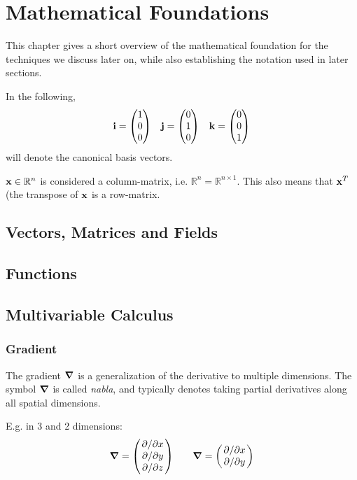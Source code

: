 \chapter{Mathematical Foundations}
\label{sec:mathematicalFoundations}
This chapter gives a short overview of the mathematical foundation for the
techniques we discuss later on, while also establishing the notation used in
later sections.

In the following,
\begin{equation*}
    \vb{i} = \mqty( 1 \\ 0 \\ 0 )\quad
    \vb{j} = \mqty( 0 \\ 1 \\ 0 )\quad
    \vb{k} = \mqty( 0 \\ 0 \\ 1 )
\end{equation*}
will denote the canonical basis vectors.

$\vb{x} \in \mathbb{R}^n$ is considered a column-matrix, i.e. $\mathbb{R}^n
= \mathbb{R}^{n \times 1}$. This also means that $\vb{x}^T$ (the transpose of
$\vb{x}$ is a row-matrix.

\section{Vectors, Matrices and Fields}

\section{Functions}

\section{Multivariable Calculus}

\subsection*{Gradient}
The gradient $\grad$ is a generalization of the derivative to multiple
dimensions. The symbol $\grad$ is called \textit{nabla}, and typically denotes
taking partial derivatives along all spatial dimensions. 

E.g. in 3 and 2 dimensions:
$$\grad = \mqty(\pdv*{x} \\ \pdv*{y} \\ \pdv*{z}) \qquad
\grad = \mqty(\pdv*{x} \\ \pdv*{y})$$

